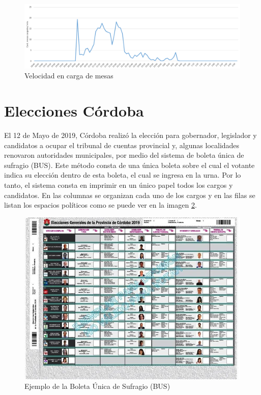 \begin{figure}[h!]
  \includegraphics[width=1\textwidth]{8w25IVQD5U.png}
  \caption{Velocidad en carga de mesas}
  \label{graf:velocidadRioNegro}
\end{figure}

\section{Elecciones Córdoba}
El 12 de Mayo de 2019, Córdoba realizó la elección para gobernador, legislador y candidatos a ocupar el tribunal de cuentas provincial y, algunas localidades renovaron autoridades municipales, por medio del sistema de boleta única de sufragio (BUS). Este método consta de una única boleta sobre el cual el votante indica su elección dentro de esta boleta, el cual se ingresa en la urna. Por lo tanto, el sistema consta en imprimir en un único papel todos los cargos y candidatos. En las columnas se organizan cada uno de los cargos y en las filas se listan los espacios políticos como se puede ver en la imagen \ref{graf:BUSCordoba}.
\begin{figure}[h!]
  \includegraphics[width=1\textwidth]{boletaunica-cordoba.jpg}
  \caption{Ejemplo de la Boleta Única de Sufragio (BUS)}
  \label{graf:BUSCordoba}
\end{figure}
